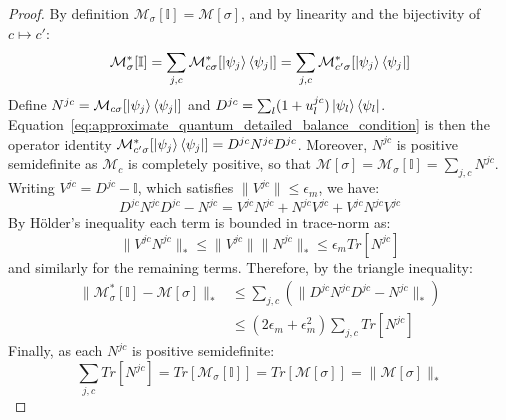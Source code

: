 \documentclass[aps,floatfix,10pt,amssymb,amsfont,amsmath,superscriptaddress,float,nofootinbib,longbibliography,nobalancelastpage,twocolumn]{revtex4-2}
\begin{document}
\begin{proof}
    By definition $\mathcal{M}_{\sigma}[\mathbb{I}] = \mathcal{M}[\sigma]$, and by linearity and the bijectivity of $c \mapsto c'$:
    \begin{equation}
        \mathcal{M}^*_{\sigma}[\mathbb{I}] = \sum_{j,c}\mathcal{M}^*_{c\sigma}[\ket{\psi_j}\bra{\psi_j}] = \sum_{j,c}\mathcal{M}^*_{c'\sigma}[\ket{\psi_j}\bra{\psi_j}]
    \end{equation}
    Define $N^{jc} = \mathcal{M}_{c\sigma}[\ket{\psi_j}\bra{\psi_j}]$ and $D^{jc}=\sum_l(1+u_l^{jc})\ket{\psi_l}\bra{\psi_l}$. Equation~\eqref{eq:approximate_quantum_detailed_balance_condition} is then the operator identity $\mathcal{M}^*_{c'\sigma}[\ket{\psi_j}\bra{\psi_j}]=D^{jc}N^{jc}D^{jc}$. Moreover, $N^{jc}$ is positive semidefinite as $\mathcal{M}_c$ is completely positive, so that $\mathcal{M}[\sigma] = \mathcal{M}_{\sigma}[\mathbb{I}] = \sum_{j,c}N^{jc}$. Writing $V^{jc} = D^{jc}-\mathbb{I}$, which satisfies $\|V^{jc}\|\leq\epsilon_m$, we have:
    \begin{equation}
        D^{jc}N^{jc}D^{jc} - N^{jc} = V^{jc}N^{jc} + N^{jc}V^{jc} + V^{jc}N^{jc}V^{jc}
    \end{equation}
    By H\"older's inequality each term is bounded in trace-norm as:
    \begin{equation}
        \|V^{jc}N^{jc}\|_* \leq \|V^{jc}\|\|N^{jc}\|_* \leq \epsilon_m Tr[N^{jc}]
    \end{equation}
    and similarly for the remaining terms. Therefore, by the triangle inequality:
    \begin{align}
        \|\mathcal{M}^*_{\sigma}[\mathbb{I}]-\mathcal{M}[\sigma]\|_* &\leq \sum_{j,c}\left(\|D^{jc}N^{jc}D^{jc}-N^{jc}\|_*\right)\\
        &\leq (2\epsilon_m+\epsilon_m^2)\sum_{j,c}Tr[N^{jc}] 
    \end{align}
    Finally, as each $N^{jc}$ is positive semidefinite:
    \begin{equation}
        \sum_{j,c}Tr[N^{jc}] = Tr[\mathcal{M}_{\sigma}[\mathbb{I}]] = Tr[\mathcal{M}[\sigma]] = \|\mathcal{M}[\sigma]\|_*
    \end{equation}
\end{proof}
\end{document}
